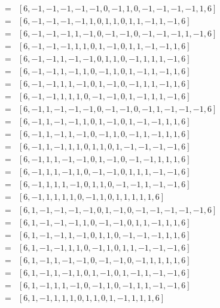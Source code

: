 \documentclass[12pt]{article}
\theoremstyle{plain}
\theoremstyle{definition}
\theoremstyle{remark}
\theoremstyle{definition}
\begin{document}
\begin{eqnarray*}
    [w_{1}, ..., w_{16}] & = & [6, -1, -1, -1, -1, -1, 0, -1, 1, 0, -1, -1, -1, -1, 1, 6] \\
    & = & [6, -1, -1, -1, -1, 1, 0, 1, 1, 0, 1, 1, -1, 1, -1, 6] \\
    & = & [6, -1, -1, -1, 1, -1, 0, -1, -1, 0, -1, -1, -1, 1, -1, 6] \\
    & = & [6, -1, -1, -1, 1, 1, 0, 1, -1, 0, 1, 1, -1, -1, 1, 6] \\
    & = & [6, -1, -1, 1, -1, -1, 0, 1, 1, 0, -1, 1, 1, 1, -1, 6] \\
    & = & [6, -1, -1, 1, -1, 1, 0, -1, 1, 0, 1, -1, 1, -1, 1, 6] \\
    & = & [6, -1, -1, 1, 1, -1, 0, 1, -1, 0, -1, 1, 1, -1, 1, 6] \\
    & = & [6, -1, -1, 1, 1, 1, 0, -1, -1, 0, 1, -1, 1, 1, -1, 6] \\
    & = & [6, -1, 1, -1, -1, -1, 0, -1, -1, 0, -1, 1, -1, -1, -1, 6] \\
    & = & [6, -1, 1, -1, -1, 1, 0, 1, -1, 0, 1, -1, -1, 1, 1, 6] \\
    & = & [6, -1, 1, -1, 1, -1, 0, -1, 1, 0, -1, 1, -1, 1, 1, 6] \\
    & = & [6, -1, 1, -1, 1, 1, 0, 1, 1, 0, 1, -1, -1, -1, -1, 6] \\
    & = & [6, -1, 1, 1, -1, -1, 0, 1, -1, 0, -1, -1, 1, 1, 1, 6] \\
    & = & [6, -1, 1, 1, -1, 1, 0, -1, -1, 0, 1, 1, 1, -1, -1, 6] \\
    & = & [6, -1, 1, 1, 1, -1, 0, 1, 1, 0, -1, -1, 1, -1, -1, 6] \\
    & = & [6, -1, 1, 1, 1, 1, 0, -1, 1, 0, 1, 1, 1, 1, 1, 6] \\
    & = & [6, 1, -1, -1, -1, -1, 0, 1, -1, 0, -1, -1, -1, -1, -1, 6] \\
    & = & [6, 1, -1, -1, -1, 1, 0, -1, -1, 0, 1, 1, -1, 1, 1, 6] \\
    & = & [6, 1, -1, -1, 1, -1, 0, 1, 1, 0, -1, -1, -1, 1, 1, 6] \\
    & = & [6, 1, -1, -1, 1, 1, 0, -1, 1, 0, 1, 1, -1, -1, -1, 6] \\
    & = & [6, 1, -1, 1, -1, -1, 0, -1, -1, 0, -1, 1, 1, 1, 1, 6] \\
    & = & [6, 1, -1, 1, -1, 1, 0, 1, -1, 0, 1, -1, 1, -1, -1, 6] \\
    & = & [6, 1, -1, 1, 1, -1, 0, -1, 1, 0, -1, 1, 1, -1, -1, 6] \\
    & = & [6, 1, -1, 1, 1, 1, 0, 1, 1, 0, 1, -1, 1, 1, 1, 6] \\

\end{eqnarray*}
\end{document}
